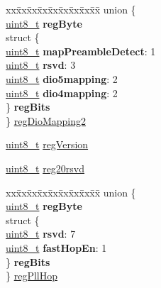 \begin{DoxyCompactItemize}
\begin{tabbing}
\end{tabbing}\item 
\begin{tabbing}
xx\=xx\=xx\=xx\=xx\=xx\=xx\=xx\=xx\=\kill
union \{\\
\>\hyperlink{vl53l0x__types_8h_aba7bc1797add20fe3efdf37ced1182c5}{uint8\_t} {\bfseries regByte}\\
\>struct \{\\
\>\>\hyperlink{vl53l0x__types_8h_aba7bc1797add20fe3efdf37ced1182c5}{uint8\_t} {\bfseries mapPreambleDetect}: 1\\
\>\>\hyperlink{vl53l0x__types_8h_aba7bc1797add20fe3efdf37ced1182c5}{uint8\_t} {\bfseries rsvd}: 3\\
\>\>\hyperlink{vl53l0x__types_8h_aba7bc1797add20fe3efdf37ced1182c5}{uint8\_t} {\bfseries dio5mapping}: 2\\
\>\>\hyperlink{vl53l0x__types_8h_aba7bc1797add20fe3efdf37ced1182c5}{uint8\_t} {\bfseries dio4mapping}: 2\\
\>\} {\bfseries regBits}\\
\} \hyperlink{structFSK__Register__Map_a759efaf7bc31c456f25300e2cec41f4c}{regDioMapping2}\\

\end{tabbing}\item 
\hyperlink{vl53l0x__types_8h_aba7bc1797add20fe3efdf37ced1182c5}{uint8\+\_\+t} \hyperlink{structFSK__Register__Map_afd8a85ac37879ffcb6238b5a6af1d3a0}{reg\+Version}
\item 
\hyperlink{vl53l0x__types_8h_aba7bc1797add20fe3efdf37ced1182c5}{uint8\+\_\+t} \hyperlink{structFSK__Register__Map_a6bf2a5eebe8ee09126136115f13b171d}{reg20rsvd}
\item 
\begin{tabbing}
xx\=xx\=xx\=xx\=xx\=xx\=xx\=xx\=xx\=\kill
union \{\\
\>\hyperlink{vl53l0x__types_8h_aba7bc1797add20fe3efdf37ced1182c5}{uint8\_t} {\bfseries regByte}\\
\>struct \{\\
\>\>\hyperlink{vl53l0x__types_8h_aba7bc1797add20fe3efdf37ced1182c5}{uint8\_t} {\bfseries rsvd}: 7\\
\>\>\hyperlink{vl53l0x__types_8h_aba7bc1797add20fe3efdf37ced1182c5}{uint8\_t} {\bfseries fastHopEn}: 1\\
\>\} {\bfseries regBits}\\
\} \hyperlink{structFSK__Register__Map_abbdf696294432f13a54dce470c386a92}{regPllHop}\\


\end{tabbing}
\end{DoxyCompactItemize}
